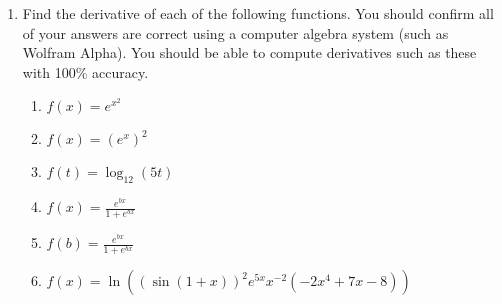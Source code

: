 \documentclass{article}
\begin{document}
\begin{enumerate}
\begin{center}
\end{center}

\begin{center}
\end{center}
                  \item Find the derivative of each of the following functions. You should confirm all of your answers are correct using a computer algebra system (such as Wolfram Alpha). You should be able to compute derivatives such as these with 100\% accuracy.
                \begin{enumerate}
                    \item $ f(x) = e^{x^2}$
                    \item $ f(x) = (e^x)^2$
                    \item $ f(t) = \log_{12}(5t)$
                    \item $ f(x) = \frac{e^{bx}}{1+e^{bx}}$
                    \item $ f(b) = \frac{e^{bx}}{1+e^{bx}}$
                    \item $ f(x) = \ln{\left(\left(\sin{(1+x)}\right)^2e^{5x}x^{-2}(-2x^4+7x-8)\right)}$
                    

\end{enumerate}
\end{enumerate}
\end{document}
